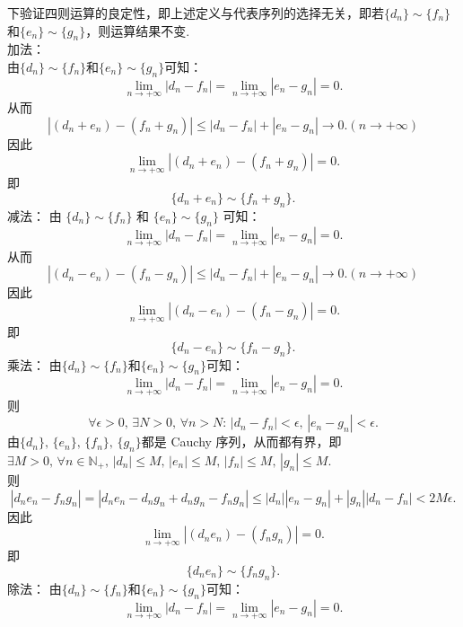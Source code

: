 \begin{enumerate}
\begin{solution}
\begin{enumerate}
        下验证四则运算的良定性，即上述定义与代表序列的选择无关，即若$\{d_{n}\}\sim\{f_{n}\}$和$\{e_{n}\}\sim\{g_{n}\}$，则运算结果不变.\\
        $\textbf{加法}$：\\
        由$\{d_{n}\}\sim\{f_{n}\}$和$\{e_{n}\}\sim\{g_{n}\}$可知：
        \[
        \lim_{n\to +\infty}\left|d_{n}-f_{n}\right|=\lim_{n\to +\infty}\left|e_{n}-g_{n}\right|=0.
        \]
        从而
        \[
        \left|(d_{n}+e_{n})-(f_{n}+g_{n})\right|\leq \left|d_{n}-f_{n}\right|+\left|e_{n}-g_{n}\right|\to 0.(n\to +\infty)
        \]
        因此
        \[
        \lim_{n\to +\infty}\left|(d_{n}+e_{n})-(f_{n}+g_{n})\right|=0.
        \]
        即
        \[
        \{d_{n}+e_{n}\}\sim\{f_{n}+g_{n}\}.
        \]
        $\textbf{减法}$：
        由 $\{d_{n}\}\sim\{f_{n}\}$ 和 $\{e_{n}\}\sim\{g_{n}\}$ 可知：
        \[
        \lim_{n\to +\infty}\left|d_{n}-f_{n}\right|=\lim_{n\to +\infty}\left|e_{n}-g_{n}\right|=0.
        \]
        从而
        \[
        \left|(d_{n}-e_{n})-(f_{n}-g_{n})\right|\leq \left|d_{n}-f_{n}\right|+\left|e_{n}-g_{n}\right|\to 0.(n\to +\infty)
        \]
        因此
        \[
        \lim_{n\to +\infty}\left|(d_{n}-e_{n})-(f_{n}-g_{n})\right|=0.
        \]
        即
        \[
        \{d_{n}-e_{n}\}\sim\{f_{n}-g_{n}\}.
        \]
        $\textbf{乘法}$：
        由$\{d_{n}\}\sim\{f_{n}\}$和$\{e_{n}\}\sim\{g_{n}\}$可知：
        \[
        \lim_{n\to +\infty}\left|d_{n}-f_{n}\right|=\lim_{n\to +\infty}\left|e_{n}-g_{n}\right|=0.
        \]
        则
        \[
        \forall\epsilon>0,\,\exists N>0,\,\forall n>N:\,\left|d_{n}-f_{n}\right|<\epsilon,\,\left|e_{n}-g_{n}\right|<\epsilon.
        \]
        由$\{d_{n}\},\,\{e_{n}\},\,\{f_{n}\},\,\{g_{n}\}$都是 Cauchy 序列，从而都有界，即$\exists M>0,\,\forall n\in\mathbb{N}_{+},\,\left|d_{n}\right|\leq M,\,\left|e_{n}\right|\leq M,\,\left|f_{n}\right|\leq M,\,\left|g_{n}\right|\leq M$.\\
        则
        \[
        \left|d_{n}e_{n}-f_{n}g_{n}\right|=\left|d_{n}e_{n}-d_{n}g_{n}+d_{n}g_{n}-f_{n}g_{n}\right|\leq \left|d_{n}\right|\left|e_{n}-g_{n}\right|+\left|g_{n}\right|\left|d_{n}-f_{n}\right|<2M\epsilon.
        \]
        因此
        \[
        \lim_{n\to +\infty}\left|(d_{n}e_{n})-(f_{n}g_{n})\right|=0.
        \]
        即
        \[
        \{d_{n}e_{n}\}\sim\{f_{n}g_{n}\}.
        \]
        $\textbf{除法}$：
        由$\{d_{n}\}\sim\{f_{n}\}$和$\{e_{n}\}\sim\{g_{n}\}$可知：
        \[
        \lim_{n\to +\infty}\left|d_{n}-f_{n}\right|=\lim_{n\to +\infty}\left|e_{n}-g_{n}\right|=0.
\]
\end{enumerate}
\end{solution}
\end{enumerate}
